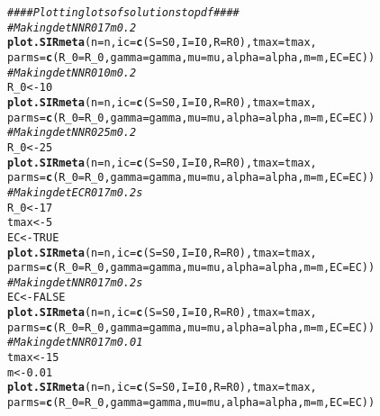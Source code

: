 \documentclass{article}\usepackage[]{graphicx}\usepackage[]{color}
\makeatletter
\newcommand{\hlnum}[1]{\textcolor[rgb]{0.686,0.059,0.569}{#1}}%
\newcommand{\hlcom}[1]{\textcolor[rgb]{0.678,0.584,0.686}{\textit{#1}}}%
\newcommand{\hlstd}[1]{\textcolor[rgb]{0.345,0.345,0.345}{#1}}%
\newcommand{\hlkwb}[1]{\textcolor[rgb]{0.69,0.353,0.396}{#1}}%
\newcommand{\hlkwc}[1]{\textcolor[rgb]{0.333,0.667,0.333}{#1}}%
\newcommand{\hlkwd}[1]{\textcolor[rgb]{0.737,0.353,0.396}{\textbf{#1}}}%
\newenvironment{kframe}{%
 \def\at@end@of@kframe{}%
 \ifinner\ifhmode%
  \def\at@end@of@kframe{\end{minipage}}%
  \begin{minipage}{\columnwidth}%
 \fi\fi%
 \def\FrameCommand##1{\hskip\@totalleftmargin \hskip-\fboxsep
 \colorbox{shadecolor}{##1}\hskip-\fboxsep
     \hskip-\linewidth \hskip-\@totalleftmargin \hskip\columnwidth}%
 \MakeFramed {\advance\hsize-\width
   \@totalleftmargin\z@ \linewidth\hsize
   \@setminipage}}%
 {\par\unskip\endMakeFramed%
 \at@end@of@kframe}
\newenvironment{knitrout}{}{} %
\makeatother
\begin{document}
\begin{knitrout}
\begin{kframe}
\begin{alltt}
\hlcom{#### Plotting lots of solutions to pdf ####}
\hlcom{#Making detNNR017m0.2}
\hlkwd{plot.SIRmeta}\hlstd{(}\hlkwc{n}\hlstd{=n,}\hlkwc{ic}\hlstd{=}\hlkwd{c}\hlstd{(}\hlkwc{S}\hlstd{=S0,}\hlkwc{I}\hlstd{=I0,}\hlkwc{R}\hlstd{=R0),}\hlkwc{tmax}\hlstd{=tmax,}
                      \hlkwc{parms}\hlstd{=}\hlkwd{c}\hlstd{(}\hlkwc{R_0}\hlstd{=R_0,}\hlkwc{gamma}\hlstd{=gamma,}\hlkwc{mu}\hlstd{=mu,}\hlkwc{alpha}\hlstd{=alpha,}\hlkwc{m}\hlstd{=m,}\hlkwc{EC}\hlstd{=EC))}
\hlcom{#Making detNNR010m0.2}
\hlstd{R_0}\hlkwb{<-}\hlnum{10}
\hlkwd{plot.SIRmeta}\hlstd{(}\hlkwc{n}\hlstd{=n,}\hlkwc{ic}\hlstd{=}\hlkwd{c}\hlstd{(}\hlkwc{S}\hlstd{=S0,}\hlkwc{I}\hlstd{=I0,}\hlkwc{R}\hlstd{=R0),}\hlkwc{tmax}\hlstd{=tmax,}
                      \hlkwc{parms}\hlstd{=}\hlkwd{c}\hlstd{(}\hlkwc{R_0}\hlstd{=R_0,}\hlkwc{gamma}\hlstd{=gamma,}\hlkwc{mu}\hlstd{=mu,}\hlkwc{alpha}\hlstd{=alpha,}\hlkwc{m}\hlstd{=m,}\hlkwc{EC}\hlstd{=EC))}
\hlcom{#Making detNNR025m0.2}
\hlstd{R_0}\hlkwb{<-}\hlnum{25}
\hlkwd{plot.SIRmeta}\hlstd{(}\hlkwc{n}\hlstd{=n,}\hlkwc{ic}\hlstd{=}\hlkwd{c}\hlstd{(}\hlkwc{S}\hlstd{=S0,}\hlkwc{I}\hlstd{=I0,}\hlkwc{R}\hlstd{=R0),}\hlkwc{tmax}\hlstd{=tmax,}
                      \hlkwc{parms}\hlstd{=}\hlkwd{c}\hlstd{(}\hlkwc{R_0}\hlstd{=R_0,}\hlkwc{gamma}\hlstd{=gamma,}\hlkwc{mu}\hlstd{=mu,}\hlkwc{alpha}\hlstd{=alpha,}\hlkwc{m}\hlstd{=m,}\hlkwc{EC}\hlstd{=EC))}
\hlcom{#Making detECR017m0.2s}
\hlstd{R_0}\hlkwb{<-}\hlnum{17}
\hlstd{tmax}\hlkwb{<-}\hlnum{5}
\hlstd{EC}\hlkwb{<-}\hlnum{TRUE}
\hlkwd{plot.SIRmeta}\hlstd{(}\hlkwc{n}\hlstd{=n,}\hlkwc{ic}\hlstd{=}\hlkwd{c}\hlstd{(}\hlkwc{S}\hlstd{=S0,}\hlkwc{I}\hlstd{=I0,}\hlkwc{R}\hlstd{=R0),}\hlkwc{tmax}\hlstd{=tmax,}
                      \hlkwc{parms}\hlstd{=}\hlkwd{c}\hlstd{(}\hlkwc{R_0}\hlstd{=R_0,}\hlkwc{gamma}\hlstd{=gamma,}\hlkwc{mu}\hlstd{=mu,}\hlkwc{alpha}\hlstd{=alpha,}\hlkwc{m}\hlstd{=m,}\hlkwc{EC}\hlstd{=EC))}
\hlcom{#Making detNNR017m0.2s}
\hlstd{EC}\hlkwb{<-}\hlnum{FALSE}
\hlkwd{plot.SIRmeta}\hlstd{(}\hlkwc{n}\hlstd{=n,}\hlkwc{ic}\hlstd{=}\hlkwd{c}\hlstd{(}\hlkwc{S}\hlstd{=S0,}\hlkwc{I}\hlstd{=I0,}\hlkwc{R}\hlstd{=R0),}\hlkwc{tmax}\hlstd{=tmax,}
                      \hlkwc{parms}\hlstd{=}\hlkwd{c}\hlstd{(}\hlkwc{R_0}\hlstd{=R_0,}\hlkwc{gamma}\hlstd{=gamma,}\hlkwc{mu}\hlstd{=mu,}\hlkwc{alpha}\hlstd{=alpha,}\hlkwc{m}\hlstd{=m,}\hlkwc{EC}\hlstd{=EC))}
\hlcom{#Making detNNR017m0.01}
\hlstd{tmax}\hlkwb{<-}\hlnum{15}
\hlstd{m}\hlkwb{<-}\hlnum{0.01}
\hlkwd{plot.SIRmeta}\hlstd{(}\hlkwc{n}\hlstd{=n,}\hlkwc{ic}\hlstd{=}\hlkwd{c}\hlstd{(}\hlkwc{S}\hlstd{=S0,}\hlkwc{I}\hlstd{=I0,}\hlkwc{R}\hlstd{=R0),}\hlkwc{tmax}\hlstd{=tmax,}
                      \hlkwc{parms}\hlstd{=}\hlkwd{c}\hlstd{(}\hlkwc{R_0}\hlstd{=R_0,}\hlkwc{gamma}\hlstd{=gamma,}\hlkwc{mu}\hlstd{=mu,}\hlkwc{alpha}\hlstd{=alpha,}\hlkwc{m}\hlstd{=m,}\hlkwc{EC}\hlstd{=EC))}

\end{alltt}
\end{kframe}
\end{knitrout}
\end{document}
